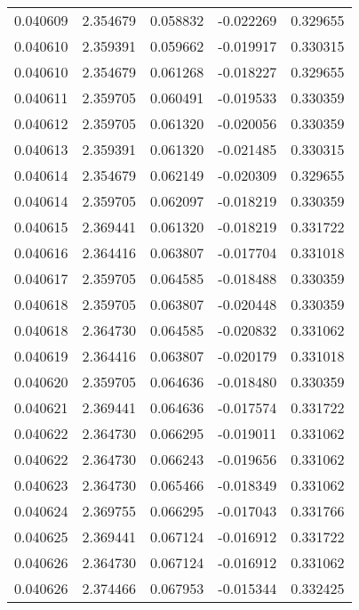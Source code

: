 \begin{tabular}{lrrrr}
0.040609    &  2.354679 &  0.058832 & -0.022269 &             0.329655 \\
0.040610    &  2.359391 &  0.059662 & -0.019917 &             0.330315 \\
0.040610    &  2.354679 &  0.061268 & -0.018227 &             0.329655 \\
0.040611    &  2.359705 &  0.060491 & -0.019533 &             0.330359 \\
0.040612    &  2.359705 &  0.061320 & -0.020056 &             0.330359 \\
0.040613    &  2.359391 &  0.061320 & -0.021485 &             0.330315 \\
0.040614    &  2.354679 &  0.062149 & -0.020309 &             0.329655 \\
0.040614    &  2.359705 &  0.062097 & -0.018219 &             0.330359 \\
0.040615    &  2.369441 &  0.061320 & -0.018219 &             0.331722 \\
0.040616    &  2.364416 &  0.063807 & -0.017704 &             0.331018 \\
0.040617    &  2.359705 &  0.064585 & -0.018488 &             0.330359 \\
0.040618    &  2.359705 &  0.063807 & -0.020448 &             0.330359 \\
0.040618    &  2.364730 &  0.064585 & -0.020832 &             0.331062 \\
0.040619    &  2.364416 &  0.063807 & -0.020179 &             0.331018 \\
0.040620    &  2.359705 &  0.064636 & -0.018480 &             0.330359 \\
0.040621    &  2.369441 &  0.064636 & -0.017574 &             0.331722 \\
0.040622    &  2.364730 &  0.066295 & -0.019011 &             0.331062 \\
0.040622    &  2.364730 &  0.066243 & -0.019656 &             0.331062 \\
0.040623    &  2.364730 &  0.065466 & -0.018349 &             0.331062 \\
0.040624    &  2.369755 &  0.066295 & -0.017043 &             0.331766 \\
0.040625    &  2.369441 &  0.067124 & -0.016912 &             0.331722 \\
0.040626    &  2.364730 &  0.067124 & -0.016912 &             0.331062 \\
0.040626    &  2.374466 &  0.067953 & -0.015344 &             0.332425 \\

\end{tabular}

